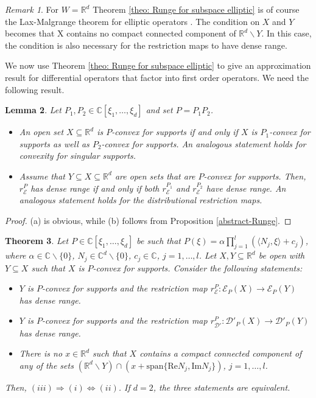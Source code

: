\documentclass[12pt]{amsart}
\newcommand{\R}{\mathbb{R}}
\newcommand{\C}{\mathbb{C}}
\newtheorem{theorem}{Theorem}[section]
\newtheorem{lemma}[theorem]{Lemma}
\theoremstyle{definition}
\theoremstyle{remark}
\newtheorem{remark}[theorem]{Remark}
\numberwithin{equation}{section}
\begin{document}
\begin{remark}\label{remark-LM}
	For $W=\R^d$ Theorem \ref{theo: Runge for subspace elliptic} is of course the Lax-Malgrange theorem for elliptic operators  \cite{Lax, Malgrange}. The condition on $X$ and $Y$ becomes that X contains no compact connected component of $\R^d\backslash Y$. In this case, the condition is also necessary for the restriction maps to have dense range.
\end{remark}


We now use Theorem \ref{theo: Runge for subspace elliptic} to give an approximation result for differential operators that factor into first order operators. We need the following result.

\begin{lemma}\label{prop: composition of differential operators}
	Let $P_1,P_2\in\C[\xi_1,\ldots,\xi_d]$ and set $P=P_1P_2$.
	\begin{itemize}
		\item[(a)] An open set $X\subseteq\R^d$ is $P$-convex for supports if and only if $X$ is $P_1$-convex for supports as well as $P_2$-convex for supports. An analogous statement holds for convexity for singular supports.
		\item[(b)] Assume that $Y \subseteq X\subseteq\R^d$ are open sets that are $P$-convex for supports. Then, $r_\mathscr{E}^P$ has dense range if and only if both $r_\mathscr{E}^{P_1}$ and $r_\mathscr{E}^{P_2}$ have dense range. An analogous statement holds for the distributional restriction maps.
	\end{itemize}
\end{lemma}

\begin{proof}
	(a) is  obvious, while (b) follows from Proposition \ref{abstract-Runge}.
\end{proof}


\begin{theorem}\label{theo: Runge for affine factors}
 Let $P \in\C[\xi_1,\ldots,\xi_d]$  be such that $P(\xi)=\alpha\prod_{j=1}^l\left(\langle N_j,\xi\rangle+c_j\right)$, where $\alpha\in\C\backslash\{0\}$, $N_j\in \C^d\backslash\{0\}$, $c_j\in\C$, $j=1,\ldots,l$. 
 Let $X,Y \subseteq\R^d$ be open with $Y \subseteq X$ such that $X$ is $P$-convex for supports. Consider the following statements:
	\begin{itemize}
			\item[(i)] $Y$ is $P$-convex for supports and the restriction map $r_{\mathscr{E}}^P:\mathscr{E}_P(X)\rightarrow\mathscr{E}_P(Y)$ has dense range.
		\item[(ii)] $Y$ is $P$-convex for supports and the restriction map $r_{\mathscr{D}'}^P:\mathscr{D}'_P(X)\rightarrow\mathscr{D}'_P(Y)$ has dense range.
		\item[(iii)] There is no $x\in\R^d$ such that $X$ contains a compact connected component of any of the sets $(\R^d\backslash Y)\cap\left(x+\mbox{span}\{\mbox{Re}N_j, \mbox{Im}N_j\}\right)$, $j=1,\ldots, l$.
	\end{itemize}
	Then, $(iii) \Rightarrow(i) \Leftrightarrow (ii)$. If $d=2$, the three statements are equivalent.
\end{theorem}
\end{document}
